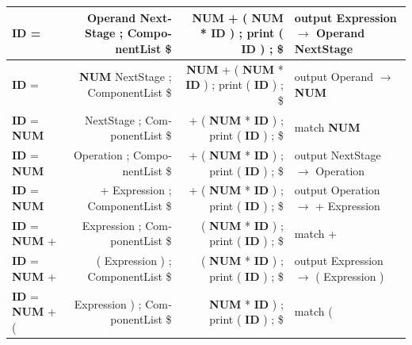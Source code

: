 \documentclass{article}
\begin{document}
\begin{latin}
\begin{table}[H]
{\begin{tabular}{|l|r|r|l|}
\textbf{ID} =                                                                         & Operand NextStage ; ComponentList \$        & \textbf{NUM} + ( \textbf{NUM} * \textbf{ID} ) ; print ( \textbf{ID} ) ; \$               & output Expression $\longrightarrow$ Operand NextStage            \\ \hline
\textbf{ID} =                                                                         & \textbf{NUM} NextStage ; ComponentList \$   & \textbf{NUM} + ( \textbf{NUM} * \textbf{ID} ) ; print ( \textbf{ID} ) ; \$               & output Operand $\longrightarrow$ \textbf{NUM}                    \\ \hline
\textbf{ID} = \textbf{NUM}                                                            & NextStage ; ComponentList \$                & + ( \textbf{NUM} * \textbf{ID} ) ; print ( \textbf{ID} ) ; \$                            & match \textbf{NUM}                                              \\ \hline
\textbf{ID} = \textbf{NUM}                                                            & Operation ; ComponentList \$                & + ( \textbf{NUM} * \textbf{ID} ) ; print ( \textbf{ID} ) ; \$                            & output NextStage $\longrightarrow$ Operation                     \\ \hline
\textbf{ID} = \textbf{NUM}                                                            & + Expression ; ComponentList \$             & + ( \textbf{NUM} * \textbf{ID} ) ; print ( \textbf{ID} ) ; \$                            & output Operation $\longrightarrow$ + Expression                  \\ \hline
\textbf{ID} = \textbf{NUM} +                                                          & Expression ; ComponentList \$               & ( \textbf{NUM} * \textbf{ID} ) ; print ( \textbf{ID} ) ; \$                              & match +                                                         \\ \hline
\textbf{ID} = \textbf{NUM} +                                                          & ( Expression ) ; ComponentList \$           & ( \textbf{NUM} * \textbf{ID} ) ; print ( \textbf{ID} ) ; \$                              & output Expression $\longrightarrow$ ( Expression )               \\ \hline
\textbf{ID} = \textbf{NUM} + (                                                        & Expression ) ; ComponentList \$             & \textbf{NUM} * \textbf{ID} ) ; print ( \textbf{ID} ) ; \$                                & match (                                                         \\ \hline

\end{tabular}}
\end{table}
\end{latin}
\end{document}
